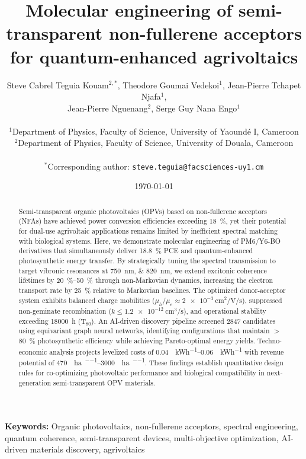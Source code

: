 \documentclass[11pt,a4paper]{article}
\title{\textbf{Molecular engineering of semi-transparent non-fullerene acceptors for quantum-enhanced agrivoltaics}}
\author{
    Steve Cabrel Teguia Kouam$^{2,*}$,
    Theodore Goumai Vedekoi$^{1}$,
    Jean-Pierre Tchapet Njafa$^{1}$, \\
    Jean-Pierre Nguenang$^{2}$,
    Serge Guy Nana Engo$^{1}$ \\
    \\
    $^{1}$Department of Physics, Faculty of Science, University of Yaoundé I, Cameroon \\
    $^{2}$Department of Physics, Faculty of Science, University of Douala, Cameroon \\
    \\
    $^{*}$Corresponding author: \texttt{steve.teguia@facsciences-uy1.cm}
}
\date{\today}
\begin{document}
\maketitle


\begin{abstract}
Semi-transparent organic photovoltaics (OPVs) based on non-fullerene acceptors (NFAs) have achieved power conversion efficiencies exceeding \SI{18}{\percent}, yet their potential for dual-use agrivoltaic applications remains limited by inefficient spectral matching with biological systems. Here, we demonstrate molecular engineering of PM6/Y6-BO derivatives that simultaneously deliver \SI{18.8}{\percent} PCE and quantum-enhanced photosynthetic energy transfer. By strategically tuning the spectral transmission to target vibronic resonances at \SIlist{750;820}{\nano\meter}, we extend excitonic coherence lifetimes by \SIrange{20}{50}{\percent} through non-Markovian dynamics, increasing the electron transport rate by \SI{25}{\percent} relative to Markovian baselines. The optimized donor-acceptor system exhibits balanced charge mobilities ($\mu_h/\mu_e \approx \SI{2e-3}{\centi\meter\squared\per\volt\per\second}$), suppressed non-geminate recombination ($k \leq \SI{1.2e-12}{\centi\meter\cubed\per\second}$), and operational stability exceeding \SI{18000}{\hour} (T$_{80}$). An AI-driven discovery pipeline screened \num{2847} candidates using equivariant graph neural networks, identifying configurations that maintain $>$\SI{80}{\percent} photosynthetic efficiency while achieving Pareto-optimal energy yields. Techno-economic analysis projects levelized costs of \SIrange{0.04}{0.06}{\USD\per\kWh} with revenue potential of \SIrange{470}{3000}{\USD\per\hectare\per\yr}. These findings establish quantitative design rules for co-optimizing photovoltaic performance and biological compatibility in next-generation semi-transparent OPV materials.
\end{abstract}


\noindent\textbf{Keywords:} Organic photovoltaics, non-fullerene acceptors, spectral engineering, quantum coherence, semi-transparent devices, multi-objective optimization, AI-driven materials discovery, agrivoltaics
\end{document}
